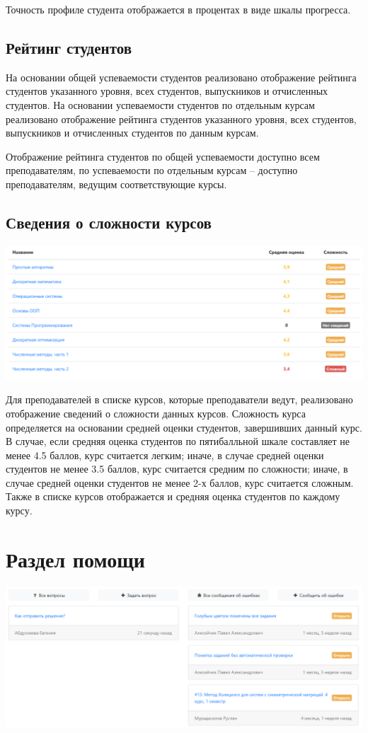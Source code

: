 \documentclass[12pt, a4paper, oneside]{article}
\begin{document}
Точность профиле студента отображается в процентах в виде шкалы прогресса.
\subsection{Рейтинг студентов}
На основании общей успеваемости студентов реализовано отображение рейтинга студентов указанного уровня, всех студентов, выпускников и отчисленных студентов. На основании успеваемости студентов по отдельным курсам реализовано отображение рейтинга студентов указанного уровня, всех студентов, выпускников и отчисленных студентов по данным курсам.

Отображение рейтинга студентов по общей успеваемости доступно всем преподавателям, по успеваемости по отдельным курсам – доступно преподавателям, ведущим соответствующие курсы.
\subsection{Сведения о сложности курсов}
\begin{center}
    \includegraphics[scale=0.25]{course-difficulty}
\end{center}

Для преподавателей в списке курсов, которые преподаватели ведут, реализовано отображение сведений о сложности данных курсов. Сложность курса определяется на основании средней оценки студентов, завершивших данный курс. В случае, если средняя оценка студентов по пятибалльной шкале составляет не менее 4.5 баллов, курс считается легким; иначе, в случае средней оценки студентов не менее 3.5 баллов, курс считается средним по сложности; иначе, в случае средней оценки студентов не менее 2-х баллов, курс считается сложным. Также в списке курсов отображается и средняя оценка студентов по каждому курсу.
\newpage

\section{Раздел помощи}
\begin{center}
    \includegraphics[scale=0.25]{support}
\end{center}
\end{document}
